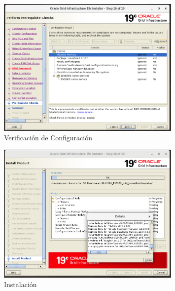\documentclass{article}
\begin{document}
\begin{figure}[H]
		\begin{center}
			\includegraphics[width=0.80\textwidth]{grid_install_16_pre_requisite_checks.png}
		\end{center}
		\caption{Verificación de Configuración}
\end{figure}

\begin{figure}[H]
		\begin{center}
			\includegraphics[width=0.80\textwidth]{grid_install_18_install.png}
		\end{center}
		\caption{Instalación}
\end{figure}
\end{document}
